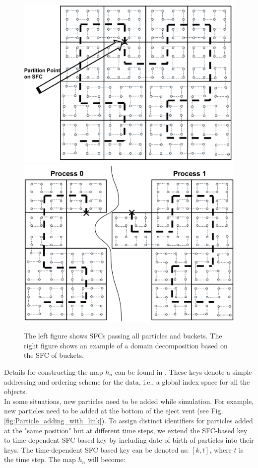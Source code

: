 \documentclass[procedia]{easychair}
\begin{document}
\begin{figure}[!t]
\centering
\includegraphics[scale=0.15]{SFC_particles_buckets}
\hfil
\includegraphics[scale = 0.16]{SFC_particles_buckets_partition}
\caption{The left figure shows SFCs passing all particles and buckets. The right figure shows an example of a domain decomposition based on the SFC of buckets.}
\label{fig:SFC_domain_decomposition}
\end{figure}
%
Details for constructing the map $h_n$ can be found in \cite{patra1995problem}. These keys denote a simple addressing and ordering scheme for the data, i.e., a global index space for all the objects.\\
In some situations, new particles need to be added while simulation. For example, new particles need to be added at the bottom of the eject vent (see Fig. \ref{fig:Particle_adding_with_link}). To assign distinct identifiers for particles added at the "same position" but at different time steps, we extend the SFC-based key to time-dependent SFC based key by including date of birth of particles into their keys. The time-dependent SFC based key can be denoted as: $[k,t]$, where $t$ is the time step. The map $h_n$ will become:
\end{document}
